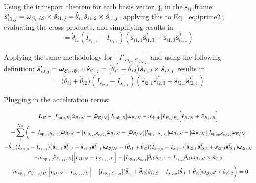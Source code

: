 \documentclass[paper]{aiaaNew}
\begin{document}
Using the transport theorem for each basis vector, j, in the $\bm{\hat{s}}_{i1}$ frame: $\hat{\bm s}'_{i1,j} = \bm\omega_{\cal{S}_{\textit{i1}}/\cal{B}}\times\hat{\bm s}_{i1,j}=\dot{\theta}_{i1}\hat{\bm s}_{i1,2}\times\hat{\bm s}_{i1,j}$, applying this to Eq.~\eqref{eq:iprime2}, evaluating the cross products, and simplifying results in
\begin{equation}
[I'_{\text{sp}_{i1},S_{c,i1}}] = \dot{\theta}_{i1}(I_{s_{i1,3}}-I_{s_{i1,1}})(\hat{\bm s}_{i1,1}\hat{\bm s}_{i1,3}^{T}+\hat{\bm s}_{i1,3}\hat{\bm s}_{i1,1}^{T})
\label{eq:iprime3}
\end{equation}

Applying the same methodology for $[I'_{\text{sp}_{i2},S_{c,i2}}]$ and using the following definition: $\hat{\bm s}'_{i2,j} = \bm\omega_{\cal{S}_{\textit{i2}}/\cal{B}}\times\hat{\bm s}_{i2,j}=\big(\dot{\theta}_{i1} + \dot{\theta}_{i2} \big)\hat{\bm s}_{i2,2}\times\hat{\bm s}_{i2,j}$ results in 
\begin{equation}
[I'_{\text{sp}_{i2},S_{c,i2}}] = \big(\dot{\theta}_{i1}+\dot{\theta}_{i2}\big)(I_{s_{i2,3}}-I_{s_{i2,1}})(\hat{\bm s}_{i2,1}\hat{\bm s}_{i2,3}^{T}+\hat{\bm s}_{i2,3}\hat{\bm s}_{i2,1}^{T})
\label{eq:iprime4}
\end{equation}

Plugging in the acceleration terms:

\begin{multline}
\bm L_B -[I_{\text{hub},B}] \dot{\bm\omega}_{\cal B/N}  -[\bm{\tilde{\omega}}_{\cal B/N}] [I_{\text{hub},B}] \bm\omega_{\cal B/N} - m_{\text{hub}} [\tilde{{\bm r}}_{B_c/B}] \Big[\ddot{\bm r}_{B/N} + \ddot{\bm r}_{B_c/B}\Big] \\
+ \sum\limits_{i}^{N_S}\bigg(-[I_{\text{sp}_{i1},S_{c,i1}}] \dot{\bm \omega}_{\cal{B/N}} -[I_{\text{sp}_{i2},S_{c,i2}}] \dot{\bm \omega}_{\cal{B/N}} -[\tilde{\bm \omega}_{\cal{B/N}}] [I_{\text{sp}_{i1},S_{c,i1}}] \bm \omega_{\cal{B/N}}-[\tilde{\bm \omega}_{\cal{B/N}}] [I_{\text{sp}_{i2},S_{c,i2}}] \bm \omega_{\cal{B/N}}\\
-\dot{\theta}_{i1} (I_{s_{i1,3}} - I_{s_{i1,1}})( \hat{\bm s}_{i1,1} \hat{\bm s}_{i1,3}^T + \hat{\bm s}_{i1,3} \hat{\bm s}_{i1,1}^T) \bm \omega_{\cal{B/N}} -(\dot{\theta}_{i1}  + \dot{\theta}_{i2})(I_{s_{i2,3}} - I_{s_{i2,1}}) (\hat{\bm s}_{i2,1} \hat{\bm s}_{i2,3}^T + \hat{\bm s}_{i2,3} \hat{\bm s}_{i2,1}^T) \bm \omega_{\cal{B/N}} \\
- m_{\text{sp}_{i1}} [\tilde{{\bm r}}_{S_{c,i1}/B}] \Big[\ddot{\bm r}_{B/N} + \ddot{\bm r}_{S_{c,i1}/B}\Big]
 -[I_{\text{sp}_{i1},S_{c,i1}}] \ddot{\theta}_{i1} \hat{\bm s}_{i1,2} 
-I_{s_{i1,2}} \dot{\theta}_{i1} \bm \omega_{\cal{B/N}} \times \hat{\bm s}_{i1,2}\\
- m_{\text{sp}_{i2}} [\tilde{{\bm r}}_{S_{c,i2}/B}] \Big[\ddot{\bm r}_{B/N} + \ddot{\bm r}_{S_{c,i2}/B}\Big]
 -[I_{\text{sp}_{i2},S_{c,i2}}] (\ddot{\theta}_{i1}  + \ddot{\theta}_{i2})\hat{\bm s}_{i2,2} 
-I_{s_{i2,2}}  (\dot{\theta}_{i1}  + \dot{\theta}_{i2}) \bm \omega_{\cal{B/N}} \times \hat{\bm s}_{i2,2} \bigg) = 0
\end{multline}
\end{document}
